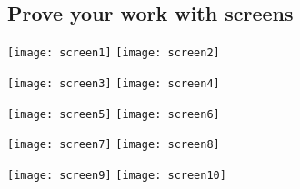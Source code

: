 \subsection{Prove your work with screens}

\texttt{[image: screen1]}
\texttt{[image: screen2]}

\texttt{[image: screen3]}
\texttt{[image: screen4]}

\texttt{[image: screen5]}
\texttt{[image: screen6]}

\texttt{[image: screen7]}
\texttt{[image: screen8]}

\texttt{[image: screen9]}
\texttt{[image: screen10]}

\clearpage